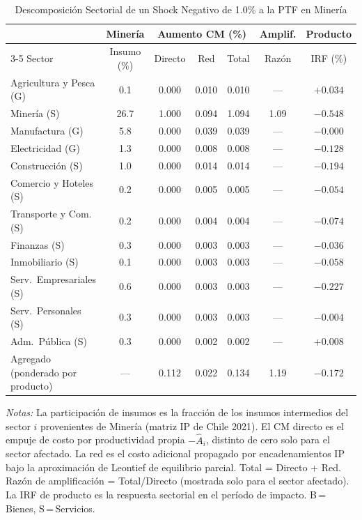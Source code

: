 \begin{table}[htbp]
\centering
\caption{Descomposición Sectorial de un Shock Negativo de 1.0\% a la PTF en Minería}
\label{tab:min_decomp}
\begin{threeparttable}
\small
\begin{tabular}{@{}l c c c c c c@{}}
\toprule
 & Minería & \multicolumn{3}{c}{Aumento CM (\%)} & Amplif. & Producto \\
\cmidrule(lr){3-5}
Sector & Insumo (\%) & Directo & Red & Total & Razón & IRF (\%) \\
\midrule
Agricultura y Pesca (G) &  0.1 & 0.000 & 0.010 & 0.010 & --- & $+0.034$ \\
Minería (S) & 26.7 & 1.000 & 0.094 & 1.094 &  1.09 & $-0.548$ \\
Manufactura (G) &  5.8 & 0.000 & 0.039 & 0.039 & --- & $-0.000$ \\
Electricidad (G) &  1.3 & 0.000 & 0.008 & 0.008 & --- & $-0.128$ \\
Construcción (S) &  1.0 & 0.000 & 0.014 & 0.014 & --- & $-0.194$ \\
Comercio y Hoteles (S) &  0.2 & 0.000 & 0.005 & 0.005 & --- & $-0.054$ \\
Transporte y Com. (S) &  0.2 & 0.000 & 0.004 & 0.004 & --- & $-0.074$ \\
Finanzas (S) &  0.3 & 0.000 & 0.003 & 0.003 & --- & $-0.036$ \\
Inmobiliario (S) &  0.1 & 0.000 & 0.003 & 0.003 & --- & $-0.058$ \\
Serv.\ Empresariales (S) &  0.6 & 0.000 & 0.003 & 0.003 & --- & $-0.227$ \\
Serv.\ Personales (S) &  0.3 & 0.000 & 0.003 & 0.003 & --- & $-0.004$ \\
Adm.\ Pública (S) &  0.3 & 0.000 & 0.002 & 0.002 & --- & $+0.008$ \\
\midrule
Agregado (ponderado por producto) & --- & 0.112 & 0.022 & 0.134 &  1.19 & $-0.172$ \\
\bottomrule
\end{tabular}
\begin{tablenotes}[flushleft]
\footnotesize
\item \textit{Notas:} La participación de insumos es la fracción de los insumos intermedios del sector $i$ provenientes de Minería (matriz IP de Chile 2021). El CM directo es el empuje de costo por productividad propia $-\hat A_i$, distinto de cero solo para el sector afectado. La red es el costo adicional propagado por encadenamientos IP bajo la aproximación de Leontief de equilibrio parcial. Total = Directo + Red. Razón de amplificación = Total/Directo (mostrada solo para el sector afectado). La IRF de producto es la respuesta sectorial en el período de impacto. B\,=\,Bienes, S\,=\,Servicios.
\end{tablenotes}
\end{threeparttable}
\end{table}

